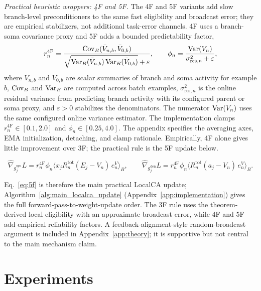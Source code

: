    \noindent\emph{Practical heuristic wrappers: 4F and 5F.}
    The 4F and 5F variants add slow branch-level preconditioners to the same fast eligibility and broadcast error; they are empirical stabilizers, not additional task-error channels. 4F uses a branch-soma covariance proxy and 5F adds a bounded predictability factor,
    \[
    r_n^{\mathrm{4F}}=
    \frac{\operatorname{Cov}_B(\bar V_{n,b},\bar V_{0,b})}
    {\sqrt{\operatorname{Var}_B(\bar V_{n,b})\operatorname{Var}_B(\bar V_{0,b})}+\varepsilon},
    \qquad
    \phi_n=\frac{\operatorname{Var}(V_n)}{\sigma_{\mathrm{res},n}^2+\varepsilon},
    \]
    where $\bar V_{n,b}$ and $\bar V_{0,b}$ are scalar summaries of branch and soma activity for example $b$, $\operatorname{Cov}_B$ and $\operatorname{Var}_B$ are computed across batch examples, $\sigma_{\mathrm{res},n}^2$ is the online residual variance from predicting branch activity with its configured parent or soma proxy, and $\varepsilon>0$ stabilizes the denominators. The numerator $\operatorname{Var}(V_n)$ uses the same configured online variance estimator. The implementation clamps $r_n^{\mathrm{4F}}\in[0.1,2.0]$ and $\phi_n\in[0.25,4.0]$. The appendix specifies the averaging axes, EMA initialization, detaching, and clamp rationale. Empirically, 4F alone gives little improvement over 3F; the practical rule is the 5F update below.
    
    \begin{definition}[5F Update]
    \begin{equation}
    \widehat{\nabla}_{g_j^{\mathrm{syn}}}L = r_n^{\mathrm{4F}} \phi_n \langle x_j R_n^{\mathrm{tot}} (E_j - V_n)\, e_n^V \rangle_B,
    \qquad
    \widehat{\nabla}_{g_j^{\mathrm{den}}}L = r_n^{\mathrm{4F}} \phi_n \langle R_n^{\mathrm{tot}} (a_j - V_n)\, e_n^V \rangle_B.
    \label{eq:5f}
    \end{equation}
    \end{definition}
    Eq.~\eqref{eq:5f} is therefore the main practical LocalCA update; Algorithm~\ref{alg:main_localca_update} (Appendix~\ref{app:implementation}) gives the full forward-pass-to-weight-update order. The 3F rule uses the theorem-derived local eligibility with an approximate broadcast error, while 4F and 5F add empirical reliability factors.
    A feedback-alignment-style random-broadcast argument is included in Appendix~\ref{app:theory}; it is supportive but not central to the main mechanism claim.
    
    \section{Experiments}
    \label{sec:experiments}
    
